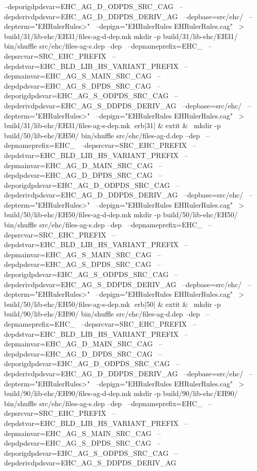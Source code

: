 	  --deporigdpdsvar=EHC_AG_D_ODPDS_SRC_CAG \
	  --depderivdpdsvar=EHC_AG_D_DDPDS_DERIV_AG \
	  --depbase=src/ehc/ \
	  --depterm="EHRulerRules>" \
	  --depign="EHRulerRules EHRulerRules.cag" \
	    > build/31/lib-ehc/EH31/files-ag-d-dep.mk
mkdir -p build/31/lib-ehc/EH31/
bin/shuffle src/ehc/files-ag-s.dep --dep \
	  --depnameprefix=EHC_ \
	  --depsrcvar=SRC_EHC_PREFIX \
	  --depdstvar=EHC_BLD_LIB_HS_VARIANT_PREFIX \
	  --depmainvar=EHC_AG_S_MAIN_SRC_CAG \
	  --depdpdsvar=EHC_AG_S_DPDS_SRC_CAG \
	  --deporigdpdsvar=EHC_AG_S_ODPDS_SRC_CAG \
	  --depderivdpdsvar=EHC_AG_S_DDPDS_DERIV_AG \
	  --depbase=src/ehc/ \
	  --depterm="EHRulerRules>" \
	  --depign="EHRulerRules EHRulerRules.cag" \
	    > build/31/lib-ehc/EH31/files-ag-s-dep.mk
erb|31| & 	extit{} & 
\
mkdir -p build/50/lib-ehc/EH50/
bin/shuffle src/ehc/files-ag-d.dep --dep \
	  --depnameprefix=EHC_ \
	  --depsrcvar=SRC_EHC_PREFIX \
	  --depdstvar=EHC_BLD_LIB_HS_VARIANT_PREFIX \
	  --depmainvar=EHC_AG_D_MAIN_SRC_CAG \
	  --depdpdsvar=EHC_AG_D_DPDS_SRC_CAG \
	  --deporigdpdsvar=EHC_AG_D_ODPDS_SRC_CAG \
	  --depderivdpdsvar=EHC_AG_D_DDPDS_DERIV_AG \
	  --depbase=src/ehc/ \
	  --depterm="EHRulerRules>" \
	  --depign="EHRulerRules EHRulerRules.cag" \
	    > build/50/lib-ehc/EH50/files-ag-d-dep.mk
mkdir -p build/50/lib-ehc/EH50/
bin/shuffle src/ehc/files-ag-s.dep --dep \
	  --depnameprefix=EHC_ \
	  --depsrcvar=SRC_EHC_PREFIX \
	  --depdstvar=EHC_BLD_LIB_HS_VARIANT_PREFIX \
	  --depmainvar=EHC_AG_S_MAIN_SRC_CAG \
	  --depdpdsvar=EHC_AG_S_DPDS_SRC_CAG \
	  --deporigdpdsvar=EHC_AG_S_ODPDS_SRC_CAG \
	  --depderivdpdsvar=EHC_AG_S_DDPDS_DERIV_AG \
	  --depbase=src/ehc/ \
	  --depterm="EHRulerRules>" \
	  --depign="EHRulerRules EHRulerRules.cag" \
	    > build/50/lib-ehc/EH50/files-ag-s-dep.mk
erb|50| & 	extit{} & 
\
mkdir -p build/90/lib-ehc/EH90/
bin/shuffle src/ehc/files-ag-d.dep --dep \
	  --depnameprefix=EHC_ \
	  --depsrcvar=SRC_EHC_PREFIX \
	  --depdstvar=EHC_BLD_LIB_HS_VARIANT_PREFIX \
	  --depmainvar=EHC_AG_D_MAIN_SRC_CAG \
	  --depdpdsvar=EHC_AG_D_DPDS_SRC_CAG \
	  --deporigdpdsvar=EHC_AG_D_ODPDS_SRC_CAG \
	  --depderivdpdsvar=EHC_AG_D_DDPDS_DERIV_AG \
	  --depbase=src/ehc/ \
	  --depterm="EHRulerRules>" \
	  --depign="EHRulerRules EHRulerRules.cag" \
	    > build/90/lib-ehc/EH90/files-ag-d-dep.mk
mkdir -p build/90/lib-ehc/EH90/
bin/shuffle src/ehc/files-ag-s.dep --dep \
	  --depnameprefix=EHC_ \
	  --depsrcvar=SRC_EHC_PREFIX \
	  --depdstvar=EHC_BLD_LIB_HS_VARIANT_PREFIX \
	  --depmainvar=EHC_AG_S_MAIN_SRC_CAG \
	  --depdpdsvar=EHC_AG_S_DPDS_SRC_CAG \
	  --deporigdpdsvar=EHC_AG_S_ODPDS_SRC_CAG \
	  --depderivdpdsvar=EHC_AG_S_DDPDS_DERIV_AG \
